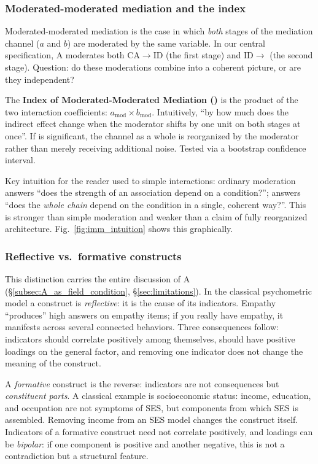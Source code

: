 \subsubsection{Moderated-moderated mediation and the \IMM{} index}

Moderated-moderated mediation is the case in which \emph{both} stages of the mediation channel ($a$ and $b$) are moderated by the same variable. In our central specification, A moderates both CA$\to$ID (the first stage) and ID$\to$\EAF{} (the second stage). Question: do these moderations combine into a coherent picture, or are they independent?

The \textbf{Index of Moderated-Moderated Mediation (\IMM)} \citep{hayes2018} is the product of the two interaction coefficients: $a_{\text{mod}} \times b_{\text{mod}}$. Intuitively, ``by how much does the indirect effect change when the moderator shifts by one unit on both stages at once''. If \IMM{} is significant, the channel as a whole is reorganized by the moderator rather than merely receiving additional noise. Tested via a bootstrap confidence interval.

Key intuition for the reader used to simple interactions: ordinary moderation answers ``does the strength of an association depend on a condition?''; \IMM{} answers ``does the \emph{whole chain} depend on the condition in a single, coherent way?''. This is stronger than simple moderation and weaker than a claim of fully reorganized architecture. Fig.~\ref{fig:imm_intuition} shows this graphically.

\subsubsection{Reflective vs.\ formative constructs}

This distinction carries the entire discussion of A (§\ref{subsec:A_as_field_condition}, §\ref{sec:limitations}). In the classical psychometric model a construct is \emph{reflective}: it is the cause of its indicators. Empathy ``produces'' high answers on empathy items; if you really have empathy, it manifests across several connected behaviors. Three consequences follow: indicators should correlate positively among themselves, should have positive loadings on the general factor, and removing one indicator does not change the meaning of the construct.

A \emph{formative} construct is the reverse: indicators are not consequences but \emph{constituent parts}. A classical example is socioeconomic status: income, education, and occupation are not symptoms of SES, but components from which SES is assembled. Removing income from an SES model changes the construct itself. Indicators of a formative construct need not correlate positively, and loadings can be \emph{bipolar}: if one component is positive and another negative, this is not a contradiction but a structural feature.

